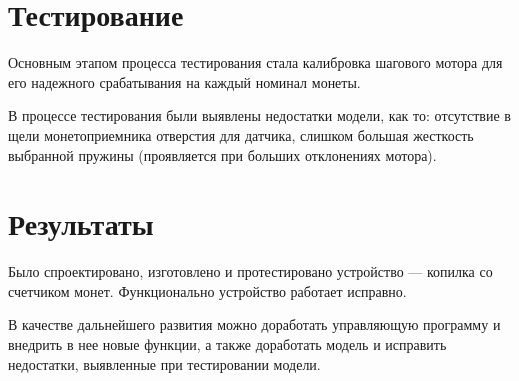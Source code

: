 \section {Тестирование}

Основным этапом процесса тестирования стала калибровка шагового мотора для его надежного срабатывания на каждый номинал монеты.

В процессе тестирования были выявлены недостатки модели, как то: отсутствие в щели монетоприемника отверстия для датчика, слишком большая жесткость выбранной пружины (проявляется при больших отклонениях мотора).

\section {Результаты}

Было спроектировано, изготовлено и протестировано устройство — копилка со счетчиком монет. Функционально устройство работает исправно.

В качестве дальнейшего развития можно доработать управляющую программу и внедрить в нее новые функции, а также доработать модель и исправить недостатки, выявленные при тестировании модели.